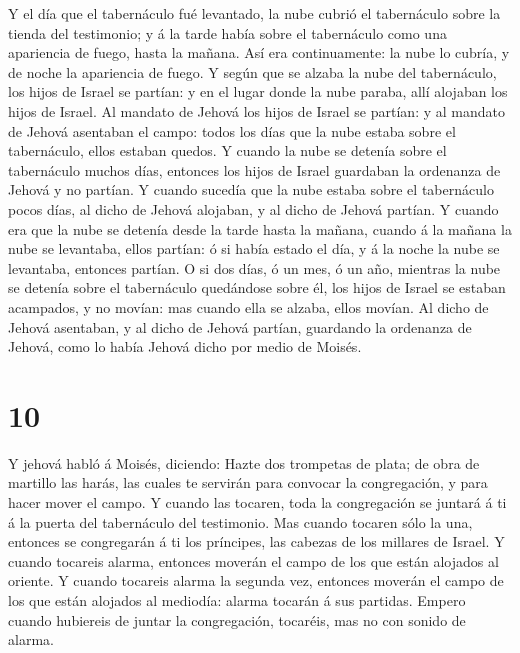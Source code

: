  Y el día que el tabernáculo fué levantado, la nube cubrió
el tabernáculo sobre la tienda del testimonio; y á la tarde había sobre
el tabernáculo como una apariencia de fuego, hasta la mañana.
 Así era continuamente: la nube lo cubría, y de noche la
apariencia de fuego.  Y según que se alzaba la nube del
tabernáculo, los hijos de Israel se partían: y en el lugar donde la nube
paraba, allí alojaban los hijos de Israel.  Al mandato de
Jehová los hijos de Israel se partían: y al mandato de Jehová asentaban
el campo: todos los días que la nube estaba sobre el tabernáculo, ellos
estaban quedos.  Y cuando la nube se detenía sobre el
tabernáculo muchos días, entonces los hijos de Israel guardaban la
ordenanza de Jehová y no partían.  Y cuando sucedía que la
nube estaba sobre el tabernáculo pocos días, al dicho de Jehová
alojaban, y al dicho de Jehová partían.  Y cuando era que
la nube se detenía desde la tarde hasta la mañana, cuando á la mañana la
nube se levantaba, ellos partían: ó si había estado el día, y á la noche
la nube se levantaba, entonces partían.  O si dos días, ó
un mes, ó un año, mientras la nube se detenía sobre el tabernáculo
quedándose sobre él, los hijos de Israel se estaban acampados, y no
movían: mas cuando ella se alzaba, ellos movían.  Al dicho
de Jehová asentaban, y al dicho de Jehová partían, guardando la
ordenanza de Jehová, como lo había Jehová dicho por medio de Moisés.

\hypertarget{section-9}{%
\section{10}\label{section-9}}

 Y jehová habló á Moisés, diciendo:  Hazte dos
trompetas de plata; de obra de martillo las harás, las cuales te
servirán para convocar la congregación, y para hacer mover el campo.
 Y cuando las tocaren, toda la congregación se juntará á ti
á la puerta del tabernáculo del testimonio.  Mas cuando
tocaren sólo la una, entonces se congregarán á ti los príncipes, las
cabezas de los millares de Israel.  Y cuando tocareis
alarma, entonces moverán el campo de los que están alojados al oriente.
 Y cuando tocareis alarma la segunda vez, entonces moverán
el campo de los que están alojados al mediodía: alarma tocarán á sus
partidas.  Empero cuando hubiereis de juntar la
congregación, tocaréis, mas no con sonido de alarma.

